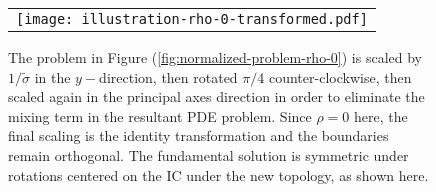 %

\begin{figure}
  \centering
  \begin{tabular}{c}
    \begin{minipage}{0.40\textwidth}
      \centering
      \texttt{[image: illustration-rho-0-transformed.pdf]}
      \caption{The problem in Figure
        (\ref{fig:normalized-problem-rho-0}) is scaled by
        $1/\tilde{\sigma}$ in the $y-$direction, then rotated $\pi/4$
        counter-clockwise, then scaled again in the principal axes
        direction in order to eliminate the mixing term in the
        resultant PDE problem. Since $\rho=0$ here, the final scaling
        is the identity transformation and the boundaries remain
        orthogonal. The fundamental solution is symmetric under
        rotations centered on the IC under the new topology, as shown
        here.}
      \label{fig:transformed-problem-rho-0}
    \end{minipage}
  \end{tabular}
\end{figure}

